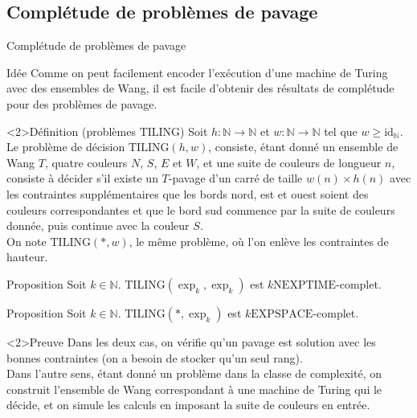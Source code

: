 \documentclass{beamer}
\renewcommand{\ge}{\geqslant}
\newcommand{\N}{\mathbb N}
\newcommand{\id}{\mathrm{id}}
\begin{document}
\subsection{Complétude de problèmes de pavage}

    \begin{frame}{Complétude de problèmes de pavage}
        
    \begin{block}{Idée}
        Comme on peut facilement encoder l'exécution d'une machine de Turing avec des ensembles de Wang, il est facile d'obtenir des résultats de complétude pour des problèmes de pavage. 
    \end{block}
    
    \begin{alertblock}<2>{Définition (problèmes $\mathrm{TILING}$)}
        Soit $h:\N\to\N$ et $w:\N\to\N$ tel que $w\ge\id_\N$. Le problème de décision $\mathrm{TILING}(h,w)$, consiste, étant donné un ensemble de Wang $T$, quatre couleurs $N$, $S$, $E$ et $W$, et une suite de couleurs de longueur $n$, consiste à décider s'il existe un $T$-pavage d'un carré de taille $w(n)\times h(n)$ avec les contraintes supplémentaires que les bords nord, est et ouest soient des couleurs correspondantes et que le bord sud commence par la suite de couleurs donnée, puis continue avec la couleur $S$.\\
        On note $\mathrm{TILING}(*,w)$, le même problème, où l'on enlève les contraintes de hauteur.
    \end{alertblock}
    
    \end{frame}
    
    \begin{frame}
    
    \begin{block}{Proposition}
        Soit $k\in\N$. $\mathrm{TILING}(\exp_k,\exp_k)$ est $k\mathrm{NEXPTIME}$-complet.
      \end{block}
    
    \begin{block}{Proposition}
        Soit $k\in\N$. $\mathrm{TILING}(*,\exp_k)$ est $k\mathrm{EXPSPACE}$-complet.
    \end{block}
    
    \begin{exampleblock}<2>{Preuve}
        Dans les deux cas, on vérifie qu'un pavage est solution avec les bonnes contraintes (on a besoin de stocker qu'un seul rang).\\
        Dans l'autre sens, étant donné un problème dans la classe de complexité, on construit l'ensemble de Wang correspondant à une machine de Turing qui le décide, et on simule les calculs en imposant la suite de couleurs en entrée.
    \end{exampleblock}
    
    \end{frame}
    
\end{document}
